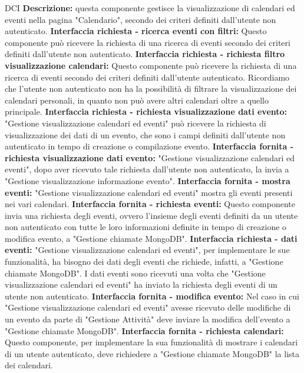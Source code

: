 \begin{listaPersonale}{DCI}
    \textbf{Descrizione:} questa componente gestisce la visualizzazione di calendari ed eventi nella pagina "Calendario", secondo dei criteri definiti dall'utente non autenticato.
    \textbf{Interfaccia richiesta - ricerca eventi con filtri:} Questo componente può ricevere la richiesta di una ricerca di eventi secondo dei criteri definiti dall'utente non autenticato.
    \textbf{Interfaccia richiesta - richiesta filtro visualizzazione
        calendari:}  Questo componente può ricevere la richiesta di una ricerca di eventi secondo dei criteri definiti dall'utente autenticato. Ricordiamo che l'utente non autenticato non ha la possibilità di filtrare la visualizzazione dei calendari personali, in quanto non può avere altri calendari oltre a quello principale.
    \textbf{Interfaccia richiesta - richiesta visualizzazione dati evento:} "Gestione visualizzazione calendari ed eventi" può ricevere la richiesta di visualizzazione dei dati di un evento, che sono i campi definiti dall'utente non autenticato in tempo di creazione o compilazione evento.
    \textbf{Interfaccia fornita - richiesta visualizzazione dati evento:}  "Gestione visualizzazione calendari ed eventi", dopo aver ricevuto tale richiesta dall'utente non autenticato, la invia a "Gestione visualizzazione informazione evento".
    \textbf{Interfaccia fornita - mostra eventi:} "Gestione visualizzazione calendari ed eventi" mostra gli eventi presenti nei vari calendari.
    \textbf{Interfaccia fornita - richiesta eventi:} Questo componente invia una richiesta degli eventi, ovvero l'insieme degli eventi definiti da un utente non autenticato con tutte le loro informazioni definite in tempo di creazione o modifica evento, a "Gestione chiamate MongoDB".
    \textbf{Interfaccia richiesta - dati eventi:} "Gestione visualizzazione calendari ed eventi", per implementare le sue funzionalità, ha bisogno dei dati degli eventi che richiede, infatti, a "Gestione chiamate MongoDB". I dati eventi sono ricevuti una volta che "Gestione visualizzazione calendari ed eventi" ha inviato la richiesta degli eventi di un utente non autenticato.
    \textbf{Interfaccia fornita - modifica evento:} Nel caso in cui "Gestione visualizzazione calendari ed eventi" avesse ricevuto delle modifiche di un evento da parte di "Gestione Attività" deve inviare la modifica dell'evento a "Gestione chiamate MongoDB".
    \textbf{Interfaccia fornita - richiesta calendari:} Questo componente, per implementare la sua funzionalità di mostrare i calendari di un utente autenticato, deve richiedere a "Gestione chiamate MongoDB" la lista dei calendari.

\end{listaPersonale}
